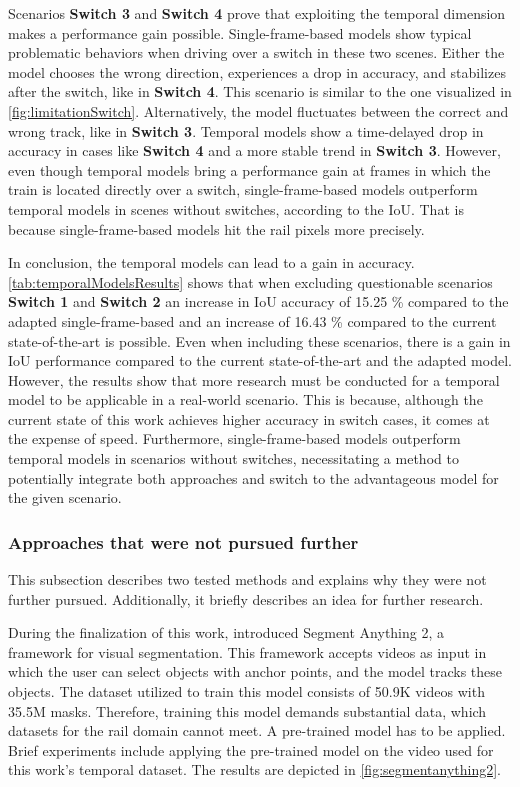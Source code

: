 Scenarios \textbf{Switch 3} and \textbf{Switch 4} prove that exploiting the temporal dimension makes a performance gain possible.
Single-frame-based models show typical problematic behaviors when driving over a switch in these two scenes.
Either the model chooses the wrong direction, experiences a drop in accuracy, and stabilizes after the switch, like in \textbf{Switch 4}.
This scenario is similar to the one visualized in \autoref{fig:limitationSwitch}.
Alternatively, the model fluctuates between the correct and wrong track, like in \textbf{Switch 3}.
Temporal models show a time-delayed drop in accuracy in cases like \textbf{Switch 4} and a more stable trend in \textbf{Switch 3}.
However, even though temporal models bring a performance gain at frames in which the train is located directly over a switch, single-frame-based models outperform temporal models in scenes without switches, according to the \ac{IoU}.
That is because single-frame-based models hit the rail pixels more precisely.

In conclusion, the temporal models can lead to a gain in accuracy.
\autoref{tab:temporalModelsResults} shows that when excluding questionable scenarios \textbf{Switch 1} and \textbf{Switch 2} an increase in \ac{IoU} accuracy of 15.25 \% compared to the adapted single-frame-based and an increase of 16.43 \% compared to the current state-of-the-art is possible.
Even when including these scenarios, there is a gain in \ac{IoU} performance compared to the current state-of-the-art and the adapted model.
However, the results show that more research must be conducted for a temporal model to be applicable in a real-world scenario.
This is because, although the current state of this work achieves higher accuracy in switch cases, it comes at the expense of speed.
Furthermore, single-frame-based models outperform temporal models in scenarios without switches, necessitating a method to potentially integrate both approaches and switch to the advantageous model for the given scenario.

\subsubsection{Approaches that were not pursued further}
\label{subsubsec:furtherApproachForOutlook}

This subsection describes two tested methods and explains why they were not further pursued.
Additionally, it briefly describes an idea for further research.

During the finalization of this work, \cite{segmentAnything22024} introduced Segment Anything 2, a framework for visual segmentation.
This framework accepts videos as input in which the user can select objects with anchor points, and the model tracks these objects.
The dataset utilized to train this model consists of 50.9K videos with 35.5M masks.
Therefore, training this model demands substantial data, which datasets for the rail domain cannot meet.
A pre-trained model has to be applied.
Brief experiments include applying the pre-trained model on the video used for this work's temporal dataset. 
The results are depicted in \autoref{fig:segmentanything2}.

